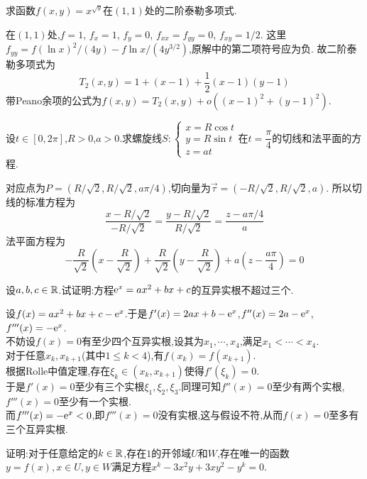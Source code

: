 \documentclass{ctexart}
\begin{document}
\begin{problem}[4.(10\songti{分})]
求函数$f(x,y)=x^{\sqrt{y}}$在$(1,1)$处的二阶泰勒多项式.
\end{problem}
\begin{solution}
在$(1,1)$处,$f=1$, $f_x=1$, $f_y=0$, $f_{xx}=f_{yy}=0$, $f_{xy}=1/2$.
这里$f_{yy}=f(\ln x)^2/(4y)-f\ln x/(4y^{3/2})$,原解中的第二项符号应为负.
故二阶泰勒多项式为
\[T_2(x,y)=1+(x-1)+\dfrac12(x-1)(y-1)\]
带Peano余项的公式为$f(x,y)=T_2(x,y)+o((x-1)^2+(y-1)^2)$.
\end{solution}
\begin{problem}[5.(10\songti{分})]
设$t\in[0,2\pi]$,$R>0$,$a>0$.求螺旋线$S:\left\{\begin{array}{l}
            x=R\cos t\\
            y=R\sin t\\
            z=at
        \end{array}\right.$在$t=\dfrac\pi4$的切线和法平面的方程.
\end{problem}
\begin{solution}
对应点为$P=(R/\sqrt2,R/\sqrt2,a\pi/4)$,切向量为$\vec\tau=(-R/\sqrt2,R/\sqrt2,a)$.
所以切线的标准方程为
\[\dfrac{x-R/\sqrt2}{-R/\sqrt2}=\dfrac{y-R/\sqrt2}{R/\sqrt2}=\dfrac{z-a\pi/4}{a}\]
法平面方程为
\[-\dfrac R{\sqrt2}\left(x-\dfrac R{\sqrt2}\right)+\dfrac R{\sqrt2}\left(y-\dfrac R{\sqrt2}\right)
+a\left(z-\dfrac{a\pi}4\right)=0\]
\end{solution}
\begin{problem}[6.(10\songti{分})]
设$a,b,c\in\mathbb{R}$.试证明:方程$\mathrm{e}^x=ax^2+bx+c$的互异实根不超过三个.
\end{problem}
\begin{solution}
设$f(x)=ax^2+bx+c-\mathrm{e}^x$.于是$f'(x)=2ax+b-\mathrm{e}^x$,$f''(x)=2a-\mathrm{e}^x$,$f'''(x)=-\mathrm{e}^x$.\\
    不妨设$f(x)=0$有至少四个互异实根,设其为$x_1,\cdots,x_4$,满足$x_1<\cdots<x_4$.\\
    对于任意$x_k,x_{k+1}$(其中$1\leqslant k<4$),有$f(x_k)=f(x_{k+1})$.\\
    根据Rolle中值定理,存在$\xi_k\in(x_k,x_{k+1})$使得$f'(\xi_k)=0$.\\
    于是$f'(x)=0$至少有三个实根$\xi_1,\xi_2,\xi_3$.同理可知$f''(x)=0$至少有两个实根,$f'''(x)=0$至少有一个实根.\\
    而$f'''(x)=-\mathrm{e}^x<0$,即$f'''(x)=0$没有实根,这与假设不符,从而$f(x)=0$至多有三个互异实根.
\end{solution}
\begin{problem}[7.(10\songti{分})]
证明:对于任意给定的$k\in\mathbb{R}$,存在$1$的开邻域$U$和$W$,存在唯一的函数$y=f(x),x\in U,y\in W$满足方程$x^k-3x^2y+3xy^2-y^k=0$.
\end{problem}
\end{document}
